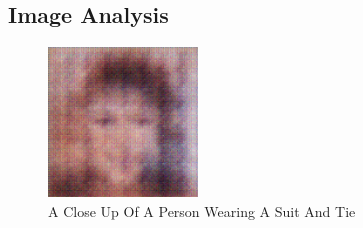\documentclass{article}%
\begin{document}
%
\subsection{Image Analysis}%
\label{subsec:ImageAnalysis}%


\begin{figure}[h!]%
\centering%
\includegraphics[width=150px]{500_fake_images/samples_5_482.png}%
\caption{A Close Up Of A Person Wearing A Suit And Tie}%
\end{figure}

%
\end{document}
